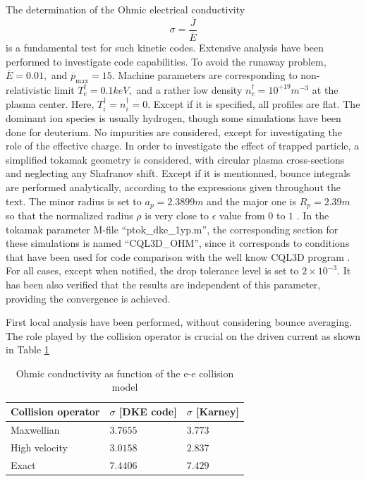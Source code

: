 
\label{conducsection}The determination of the Ohmic electrical
conductivity
\begin{equation}
\sigma =\frac{\overline{J}}{\overline{E}}
\end{equation}
is a fundamental test for such kinetic codes. Extensive analysis have been
performed to investigate code capabilities. To avoid the runaway problem, $%
\overline{E}=0.01,$ and $\overline{p}_{\max }=15.$ Machine parameters are
corresponding to non-relativistic limit $T_{e}^{\dag }=0.1keV,$ and a rather
low density $n_{e}^{\dag }=10^{+19}m^{-3}$ at the plasma center. Here, $%
T_{i}^{\dag }=n_{i}^{\dag }=0.$ Except if it is specified, all profiles are
flat. The dominant ion species is usually hydrogen, though some simulations
have been done for deuterium. No impurities are considered, except for
investigating the role of the effective charge. In order to investigate the
effect of trapped particle, a simplified tokamak geometry is considered,
with circular plasma cross-sections and neglecting any Shafranov shift.
Except if it is mentionned, bounce integrals are performed analytically,
according to the expressions given throughout the text. The minor radius is
set to $a_{p}=2.3899m$ and the major one is $R_{p}=2.39m$ so that the
normalized radius $\rho $ is very close to $\epsilon $ value from $0$ to $1$%
. In the tokamak parameter M-file ``ptok\_dke\_1yp.m'', the corresponding
section for these simulations is named ``CQL3D\_OHM'', since it
corresponds to conditions that have been used for code comparison with the
well know CQL3D program \cite{har93c1_IAEA}. For all cases, except when
notified, the drop tolerance level is set to $2\times 10^{-3}.$ It has been
also verified that the results are independent of this parameter, providing
the convergence is achieved.

First local analysis have been performed, without considering bounce
averaging. The role played by the collision operator is crucial on the
driven current as shown in Table \ref{table_cond1}

\begin{table}[tbp]
\begin{center}
\begin{tabular}{|l|l|l|}
\hline
Collision operator & $\sigma $ [DKE code] & $\sigma $ [Karney] \\ \hline
Maxwellian & $3.7655$ & $3.773$ \\ \hline
High velocity & $3.0158$ & $2.837$ \\ \hline
Exact & $7.4406$ & $7.429$ \\ \hline
\end{tabular}
\end{center}
\caption{Ohmic conductivity as function of the e-e collision model}
\label{table_cond1}
\end{table}

